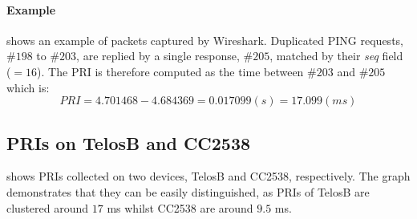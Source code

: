 \paragraph{Example}


 shows an example of packets captured by Wireshark\cite{Wireshark}. Duplicated PING requests, \#$198$ to \#$203$, are replied by a single response, \#$205$, matched by their \textit{seq} field ($=16$). The PRI is therefore computed as the time between \#$203$ and \#$205$ which is:
\begin{equation*}
PRI = 4.701468 - 4.684369 = 0.017099(s) = 17.099(ms)
\end{equation*}

\subsection{PRIs on TelosB and CC2538} \label{PRI_Devices}

 shows PRIs collected on two devices, TelosB and CC2538, respectively. The graph demonstrates that they can be easily distinguished, as PRIs of TelosB are clustered around $17$ ms whilst CC2538 are around $9.5$ ms.

